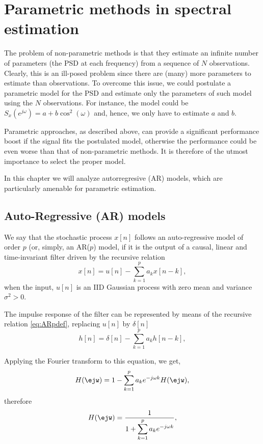 \section{Parametric methods in spectral estimation}

The problem of non-parametric methods is that they estimate an infinite number of parameters (the PSD at each frequency) from a sequence of $N$ observations. Clearly, this is an ill-posed problem since there are (many) more parameters to estimate than observations. To overcome this issue, we could postulate a parametric model for the PSD and estimate only the parameters of such model using the $N$ observations. For instance, the model could be $S_x(e^{j \omega})  = a + b \cos^2(\omega)$ and, hence, we only have to estimate $a$ and $b$.

Parametric approaches, as described above, can provide a significant performance boost if the signal fits the postulated model, otherwise the performance could be even worse than that of non-parametric methods. It is therefore of the utmost importance to select the proper model.

In this chapter we will analyze autorregresive (AR) models, which are particularly amenable for parametric estimation.

\subsection{Auto-Regressive (AR) models}

We say that the stochastic process $x[n]$ follows an auto-regressive model of order $p$ (or, simply, an AR($p$) model, if it is the output of a causal, linear and time-invariant filter driven by the recursive relation
\begin{equation}
\label{eq:ARpdef}
x[n]  = u[n] - \sum_{k=1}^p a_k x[n -k],
\end{equation}
when the input, $u[n]$ is an IID Gaussian process with zero mean and variance $\sigma^2 > 0$. 

The impulse response of the filter can be represented by means of the recursive relation \eqref{eq:ARpdef}, replacing $u[n]$ by $\delta[n]$ 
\begin{equation*}
h[n] = \delta[n] - \sum_{k=1}^{p} a_k h[n -k],
\end{equation*}

Applying the Fourier transform to this equation, we get,
\begin{equation*}
H(\ejw) = 1 - \sum_{k=1}^{p} a_k e^{-j\omega k}H(\ejw) ,
\end{equation*}
therefore
\begin{align*}
H(\ejw) = \frac{1}{\displaystyle 1 + \sum_{k = 1}^{p} a_k e^{-j \omega k}},
\end{align*}


